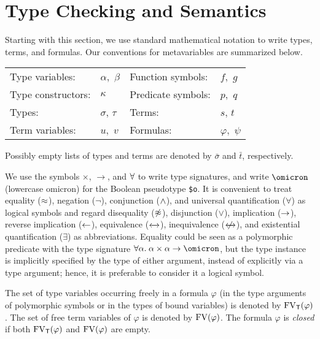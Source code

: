 \section{Type Checking and Semantics} \label{sec_semantics}

 Starting with this section, we use standard
mathematical notation to write types, terms, and formulas. Our conventions
for metavariables are summarized below.
%
\begin{center}
\begin{tabular}{l@{\enskip}l@{\qquad\quad}l@{\enskip}l}
Type variables: & $\alpha,$ $\beta$ &
  Function symbols: & $f,$ $g$ \\
Type constructors: & $\kappa$ &
  Predicate symbols: & $p,$ $q$ \\
Types: & $\sigma$, $\tau$ &
  Terms: & $s$, $t$ \\
Term variables: & $u,$ $v$ &
  Formulas: & $\varphi,$ $\psi$
\end{tabular}
\end{center}
Possibly empty lists of types and terms are denoted by $\bar{\sigma}$ and
$\bar{t}$, respectively.

We use the symbols ${\times}$, ${\to}$, and ${\forall}$
to write type signatures, and write $\omicron$ (lowercase omicron) for the
Boolean pseudotype {\tt \$o}. It is convenient to treat
equality ($\approx$), negation ($\lnot$), conjunction ($\mathrel{\land}$), and universal
quantification ($\forall$) as logical symbols and regard disequality
($\not\approx$), disjunction ($\lor$), implication ($\rightarrow$), reverse implication
($\leftarrow$), equivalence ($\leftarrow\kern-1.75ex\rightarrow$), inequivalence ($\kern.4875ex\not\kern-.4875ex\leftarrow\kern-1.75ex\rightarrow$), and existential
quantification ($\exists$) as abbreviations.
%
Equality could be seen as a polymorphic predicate with the type signature
$\forall\alpha.\mskip4.5mu \alpha\times\alpha\to\omicron$, but the type instance is
implicitly specified by the type of either argument, instead of explicitly via a
type argument; hence, it is preferable to consider it a logical symbol.

The set of type variables occurring freely in a formula $\varphi$
(in the type arguments of polymorphic symbols or
in the types of bound variables) is denoted by $\mathrm{FV}_\mathsf{T}(\varphi)$.
The set of free term variables of $\varphi$
is denoted by $\mathrm{FV}(\varphi)$. The formula $\varphi$ is {\em closed\/}
if both $\mathrm{FV}_\mathsf{T}(\varphi)$ and $\mathrm{FV}(\varphi)$ are empty.

